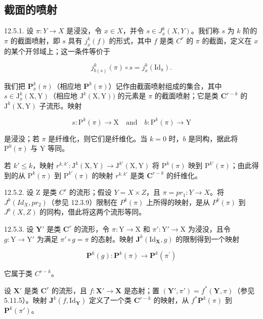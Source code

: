 \subsection{截面的喷射}

12.5.1. 设 \(\pi: Y \to X\) 是浸没，令 \(x \in X\)，并令 \(s \in J_x^k(X, Y)\)。我们称 \(s\) 为 \(k\) 阶的 \(\pi\) 的截面喷射，即 \(s\) 具有 \(j_x^k(f)\) 的形式，其中 \(f\) 是类 \(C^r\) 的 \(\pi\) 的截面，定义在 \(x\) 的某个开邻域上；这一条件等价于

\[
j _ {b (s)} ^ {k} (\pi) \circ s = j _ {x} ^ {k} (\mathrm{Id} _ {\mathrm{x}}).
\]

我们把 \(\mathbf{P}_x^k (\pi)\)（相应地 \(\mathbf{P}^k (\pi)\)）记作由截面喷射组成的集合，其中 \(s\in \mathrm{J}_x^k (\mathrm{X},\mathrm{Y})\)（相应地 \(\mathrm{J}^k (\mathrm{X},\mathrm{Y}))\) 的元素是 \(\pi\) 的截面喷射；它是类 \(\mathbf{C}^{r - k}\) 的 \(\mathrm{J}^k (\mathrm{X},\mathrm{Y})\) 子流形。映射

\[
s \colon \mathrm{P} ^ {k} (\pi) \rightarrow \mathrm{X} \quad \text {and} \quad b \colon \mathrm{P} ^ {k} (\pi) \rightarrow \mathrm{Y}
\]

是浸没；若 \(\pi\) 是纤维化，则它们是纤维化。当 \(k=0\) 时，\(b\) 是同构，据此将 \(\mathrm{P}^{0}(\pi)\) 与 Y 等同。

若 \(k' \leqslant k\)，映射 \(r^{k, k'} : \mathrm{J}^k(\mathrm{X}, \mathrm{Y}) \to \mathrm{J}^{k'}(\mathrm{X}, \mathrm{Y})\) 将 \(\mathrm{P}^k(\pi)\) 映到 \(\mathrm{P}^{k'}(\pi)\)；由此得到的从 \(\mathrm{P}^k(\pi)\) 到 \(\mathrm{P}^{k'}(\pi)\) 的映射 \(r^{k, k'}\) 是类 \(\mathbf{C}^{r-k}\) 的纤维化。

12.5.2. 设 Z 是类 \(C^{r}\) 的流形；假设 \(Y = X \times Z\)，且 \(\pi = pr_{1}: Y \to X\)。将 \(J^{k}(Id_{X}, pr_{2})\)（参见 12.3.9）限制在 \(P^{k}(\pi)\) 上所得的映射，是从 \(P^{k}(\pi)\) 到 \(J^{k}(X, Z)\) 的同构，借此将这两个流形等同。

12.5.3. 设 \(\mathbf{Y}'\) 是类 \(\mathbf{C}^{r}\) 的流形，令 \(\pi: \mathrm{Y} \to \mathrm{X}\) 和 \(\pi': \mathrm{Y}' \to \mathrm{X}\) 为浸没，且令 \(g: \mathrm{Y} \to \mathrm{Y}'\) 为满足 \(\pi' \circ g = \pi\) 的态射。映射 \(\mathbf{J}^{k}(\mathrm{Id}_{\mathbf{X}},g)\) 的限制得到一个映射

\[
\mathbf {P} ^ {k} (g) \colon \mathbf {P} ^ {k} (\pi) \to \mathbf {P} ^ {k} (\pi^ {\prime})
\]

它属于类 \(C^{r-k}\)。

设 \(\mathbf{X}'\) 是类 \(\mathbf{C}^r\) 的流形，且 \(f: \mathbf{X}' \to \mathbf{X}\) 是态射；置 \((\mathbf{Y}', \pi') = f^*(\mathbf{Y}, \pi)\)（参见 5.11.5）。映射 \(\mathbf{J}^k(f, \mathrm{Id}_\mathbf{Y})\) 定义了一个类 \(\mathbf{C}^{r-k}\) 的映射，从 \(f^*\mathbf{P}^k(\pi)\) 到 \(\mathbf{P}^k(\pi')\)。

